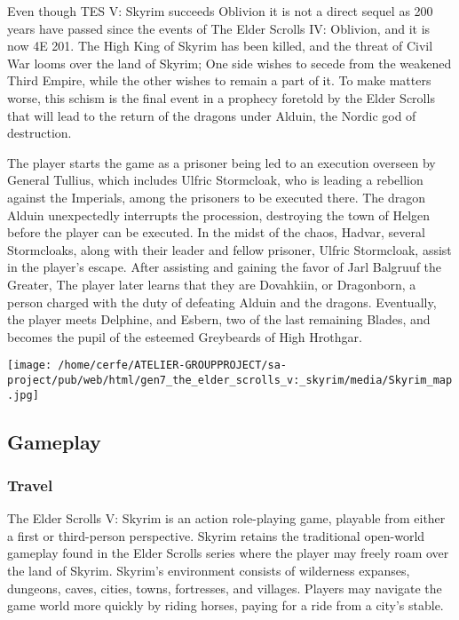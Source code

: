 \documentclass[a4paper,10pt]{book}
\begin{document}
          Even though TES V: Skyrim succeeds Oblivion it is not a direct sequel as 200 years have passed since the events of The Elder Scrolls IV: Oblivion, and it is now 4E 201. The High King of Skyrim has been killed, and the threat of Civil War looms over the land of Skyrim;
           One side wishes to secede from the weakened Third Empire, while the other wishes to remain a part of it. To make matters worse, this schism is the final event in a prophecy foretold by the Elder Scrolls that will lead to the return of the dragons under Alduin,
           the Nordic god of destruction.
         
 
 
          The player starts the game as a prisoner being led to an execution overseen by General Tullius, which includes Ulfric Stormcloak, who is leading a rebellion against the Imperials, among the prisoners to be executed there.
           The dragon Alduin unexpectedly interrupts the procession, destroying the town of Helgen before the player can be executed.  In the midst of the chaos, Hadvar, several Stormcloaks, along with their leader and fellow prisoner, Ulfric Stormcloak, assist in the player's escape.
            After assisting and gaining the favor of Jarl Balgruuf the Greater, The player later learns that they are Dovahkiin, or Dragonborn, a person charged with the duty of defeating Alduin and the dragons.
             Eventually, the player meets Delphine, and Esbern, two of the last remaining Blades, and becomes the pupil of the esteemed Greybeards of High Hrothgar.
         
 \texttt{[image: /home/cerfe/ATELIER-GROUPPROJECT/sa-project/pub/web/html/gen7\_the\_elder\_scrolls\_v:\_skyrim/media/Skyrim\_map.jpg]}
 
 \subsection{Gameplay }
 
 \subsubsection{Travel }
 
          The Elder Scrolls V: Skyrim is an action role-playing game, playable from either a first or third-person perspective. Skyrim retains the traditional open-world gameplay found in the Elder Scrolls series where the player may freely roam over the land of Skyrim. Skyrim's environment consists of wilderness expanses, dungeons, caves, cities, towns, fortresses, and villages.
           Players may navigate the game world more quickly by riding horses, paying for a ride from a city's stable.
         
\end{document}
